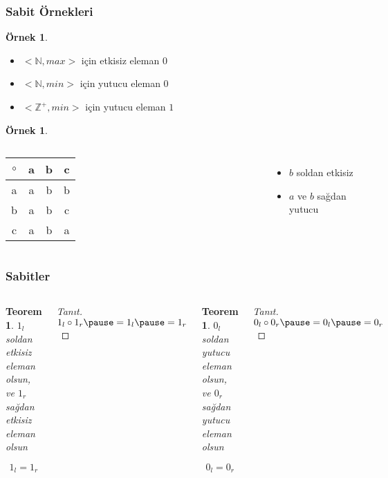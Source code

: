 \documentclass[dvipsnames]{beamer}
\theoremstyle{definition}
\theoremstyle{example}
\newtheorem{ornek}[theorem]{Örnek}
\theoremstyle{plain}
\newtheorem{teorem}[theorem]{Teorem}
\begin{document}
\begin{frame}
  \frametitle{Sabit Örnekleri}

  \begin{ornek}
    \begin{itemize}
      \item $<\mathbb{N}, max>$ için etkisiz eleman $0$
      \item $<\mathbb{N}, min>$ için yutucu eleman $0$
      \item $<\mathbb{Z}^+, min>$ için yutucu eleman $1$
    \end{itemize}
  \end{ornek}

  \pause
  \begin{ornek}
    \begin{columns}
      \begin{tabular}{c||c|c|c}
        $\circ$ & a & b & c\\\hline\hline
              a & a & b & b\\\hline
              b & a & b & c\\\hline
              c & a & b & a
      \end{tabular}

      \begin{itemize}
        \item $b$ soldan etkisiz
        \item $a$ ve $b$ sağdan yutucu
      \end{itemize}
    \end{columns}
  \end{ornek}
\end{frame}

\begin{frame}
  \frametitle{Sabitler}

  \begin{columns}
    \begin{teorem}
      $1_l$ soldan etkisiz eleman olsun, ve
      $1_r$ sağdan etkisiz eleman olsun

      \[ 1_l = 1_r \]
    \end{teorem}

    \pause
    \begin{proof}[Tanıt]
      $1_l \circ 1_r \pause = 1_l \pause = 1_r$
    \end{proof}

    \pause
    \begin{teorem}
      $0_l$ soldan yutucu eleman olsun, ve
      $0_r$ sağdan yutucu eleman olsun

      \[ 0_l = 0_r \]
    \end{teorem}

    \pause
    \begin{proof}[Tanıt]
      $0_l \circ 0_r \pause = 0_l \pause = 0_r$
    \end{proof}
  \end{columns}
\end{frame}
\end{document}
